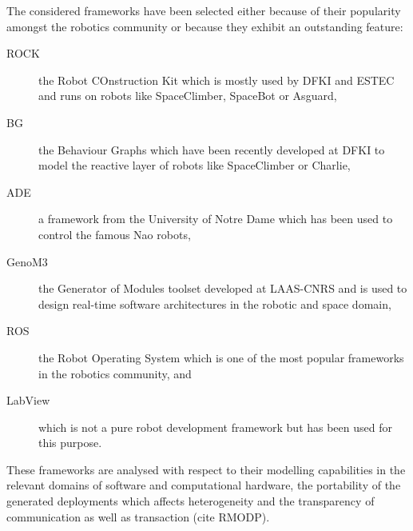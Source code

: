 \documentclass[a4paper,twocolumn]{esapub2005} %
\begin{document}
The considered frameworks have been selected either because of their popularity amongst the robotics community or because they exhibit an outstanding feature:
\begin{description}
    \item[ROCK] the Robot COnstruction Kit which is mostly used by DFKI and ESTEC and runs on robots like SpaceClimber, SpaceBot or Asguard\cite{ROCK},
    \item[BG] the Behaviour Graphs which have been recently developed at DFKI to model the reactive layer of robots like SpaceClimber or Charlie\cite{2012_Langosz},
    \item[ADE] a framework from the University of Notre Dame which has been used to control the famous Nao robots\cite{Scheutz},
    \item[GenoM3] the Generator of Modules toolset developed at LAAS-CNRS and is used to design real-time software architectures in the robotic and space domain\cite{2015_Genom3},
    \item[ROS] the Robot Operating System which is one of the most popular frameworks in the robotics community\cite{ROS}, and
    \item[LabView] which is not a pure robot development framework but has been used for this purpose\cite{2010_Muecke}.
\end{description}
These frameworks are analysed with respect to their modelling capabilities in the relevant domains of software and computational hardware, the portability of the generated deployments which affects heterogeneity and the transparency of communication as well as transaction (cite RMODP).

\end{document}
